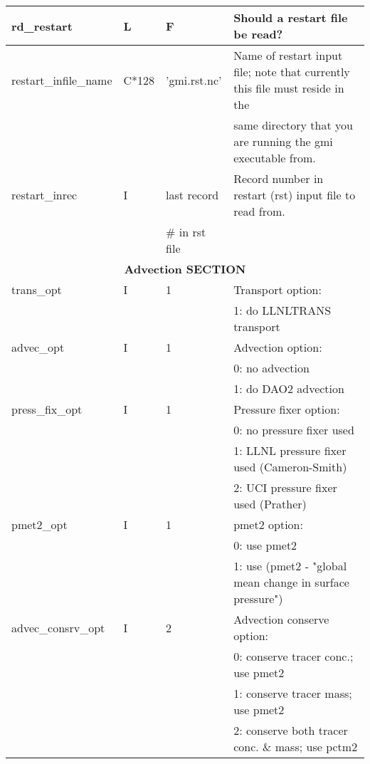 {\begin{landscape}
\begin{center}
\begin{longtable}{|l|l|l|l|}
rd\_restart            & L &  F  & Should a restart file be read?  \\ \hline
restart\_infile\_name  &C*128& 'gmi.rst.nc' & Name of restart input file; note that currently this file must reside  in the \\
                       &    &              & same directory that you are running the gmi executable from.  \\ \hline
restart\_inrec         & I  & last record  & Record number in restart (rst) input   file to read from.  \\ 
                       &    & \# in rst file         &   \\ \hline \hline
\multicolumn{4}{|c|}{\bf Advection SECTION} \\ \hline\hline
trans\_opt      & I    &    1       & Transport option:  \\
                &      &            & 1: do LLNLTRANS transport  \\ \hline
advec\_opt           & I & 1 & Advection option:  \\
                     &   &   &       0:  no advection  \\
                     &   &   &       1:  do DAO2 advection  \\ \hline
press\_fix\_opt      & I & 1 & Pressure fixer option:  \\
                     &   &   &       0:  no   pressure fixer used  \\
                     &   &   &       1:  LLNL pressure fixer used (Cameron-Smith)  \\
                     &   &   &       2:  UCI  pressure fixer used (Prather)  \\ \hline
pmet2\_opt           & I & 1 & pmet2 option:  \\
                     &   &   &       0:  use pmet2  \\
                     &   &   &       1:  use (pmet2 - "global mean change in surface pressure")  \\ \hline
advec\_consrv\_opt   & I & 2 & Advection conserve option:  \\
                     &   &   &       0:  conserve tracer conc.;             use pmet2  \\
                     &   &   &       1:  conserve tracer mass;              use pmet2  \\
                     &   &   &       2:  conserve both tracer conc. \& mass; use pctm2  \\

\end{longtable}
\end{center}
\end{landscape}}

